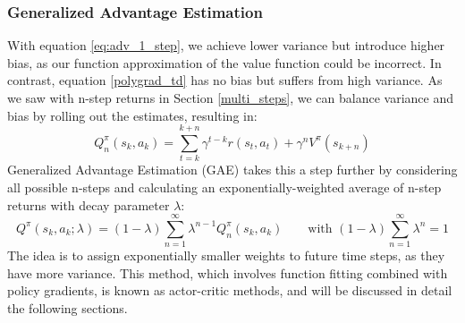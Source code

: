 \subsubsection{Generalized Advantage Estimation}
With equation \eqref{eq:adv_1_step}, we achieve lower variance but introduce higher bias, as our 
function approximation of the value function could be incorrect. In contrast, equation \eqref{polygrad_td}
has no bias but suffers from high variance. As we saw with n-step returns in Section \ref{multi_steps}, 
we can balance variance and bias by rolling out the estimates, resulting in:
$$Q_n^\pi(s_k,a_k)= \sum_{t=k}^{k+n} \gamma^{t-k}r(s_t,a_t)+ \gamma^n V^\pi(s_{k+n})$$
Generalized Advantage Estimation (GAE) takes this a step further by considering all possible n-steps
and calculating an exponentially-weighted average of n-step returns with decay parameter $\lambda$:
$$Q^\pi(s_k,a_k;\lambda) = (1-\lambda) \sum_{n=1}^\infty \lambda^{n-1}Q_n^\pi(s_k,a_k) \qquad \text{with }(1-\lambda) \sum_{n=1}^\infty \lambda^n = 1$$
The idea is to assign exponentially smaller weights to future time steps, as they have more variance.\newline
This method, which involves function fitting combined with policy gradients, is known as actor-critic methods,
and will be discussed in detail the following sections.

